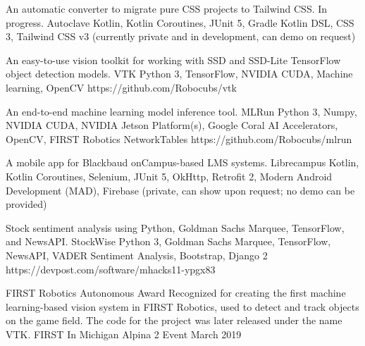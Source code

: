 \documentclass[]{awesome-cv}
\begin{document}
\vspace{-7mm}
\begin{cventries}
	\cventry
	{An automatic converter to migrate pure CSS projects to Tailwind CSS. In progress.}
	{Autoclave}
	{Kotlin, Kotlin Coroutines, JUnit 5, Gradle Kotlin DSL, CSS 3, Tailwind CSS v3}
	{(currently private and in development, can demo on request)}
	{}
	
	\vspace{-5mm}
	\cventry
	{An easy-to-use vision toolkit for working with SSD and SSD-Lite TensorFlow object detection models.}
	{VTK}
	{Python 3, TensorFlow, NVIDIA CUDA, Machine learning, OpenCV}
	{https://github.com/Robocubs/vtk}
	{}
	
	\vspace{-5mm}
	\cventry
	{An end-to-end machine learning model inference tool.}
	{MLRun}
	{Python 3, Numpy, NVIDIA CUDA, NVIDIA Jetson Platform(s), Google Coral AI Accelerators, OpenCV, FIRST Robotics NetworkTables}
	{https://github.com/Robocubs/mlrun}
	{}
	
	\vspace{-5mm}
	\cventry
	{A mobile app for Blackbaud onCampus-based LMS systems.}
	{Librecampus}
	{Kotlin, Kotlin Coroutines, Selenium, JUnit 5, OkHttp, Retrofit 2, Modern Android Development (MAD), Firebase}
	{(private, can show upon request; no demo can be provided)}
	{}
	
	\vspace{-5mm}
	\cventry
	{Stock sentiment analysis using Python, Goldman Sachs Marquee, TensorFlow, and NewsAPI.}
	{StockWise}
	{Python 3, Goldman Sachs Marquee, TensorFlow, NewsAPI, VADER Sentiment Analysis, Bootstrap, Django 2}
	{https://devpost.com/software/mhacks11-ypgx83}
	{}
	
	\vspace{-5mm}
\end{cventries}
\begin{cvhonors}
	\cvhonor
	{FIRST Robotics Autonomous Award}
	{Recognized for creating the first machine learning-based vision system in FIRST Robotics, used to detect and track objects on the game field. The code for the project was later released under the name VTK.}
	{FIRST In Michigan Alpina 2 Event}
	{March 2019}
\end{cvhonors}
\ 
\end{document}
